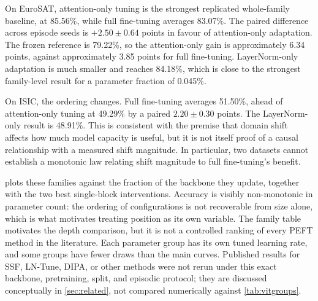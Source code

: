 \documentclass[11pt]{article}
\begin{document}
On EuroSAT, attention-only tuning is the strongest replicated whole-family baseline, at 85.56\%, while full fine-tuning averages 83.07\%. The paired difference across episode seeds is $+2.50\pm0.64$ points in favour of attention-only adaptation. The frozen reference is 79.22\%, so the attention-only gain is approximately 6.34 points, against approximately 3.85 points for full fine-tuning. LayerNorm-only adaptation is much smaller and reaches 84.18\%, which is close to the strongest family-level result for a parameter fraction of 0.045\%.

On ISIC, the ordering changes. Full fine-tuning averages 51.50\%, ahead of attention-only tuning at 49.29\% by a paired $2.20\pm0.30$ points. The LayerNorm-only result is 48.91\%. This is consistent with the premise that domain shift affects how much model capacity is useful, but it is not itself proof of a causal relationship with a measured shift magnitude. In particular, two datasets cannot establish a monotonic law relating shift magnitude to full fine-tuning's benefit.

 plots these families against the fraction of the backbone they update, together with the two best single-block interventions. Accuracy is visibly non-monotonic in parameter count: the ordering of configurations is not recoverable from size alone, which is what motivates treating position as its own variable. The family table motivates the depth comparison, but it is not a controlled ranking of every PEFT method in the literature. Each parameter group has its own tuned learning rate, and some groups have fewer draws than the main curves. Published results for SSF, LN-Tune, DIPA, or other methods were not rerun under this exact backbone, pretraining, split, and episodic protocol; they are discussed conceptually in \cref{sec:related}, not compared numerically against \cref{tab:vitgroups}.
\end{document}
